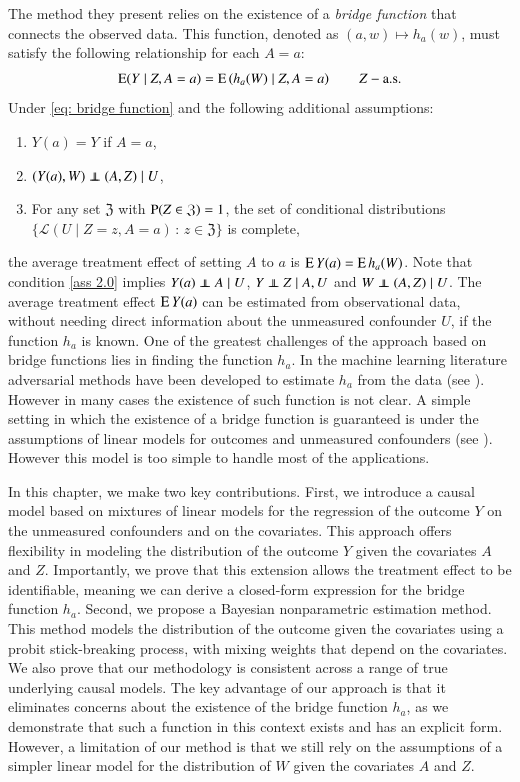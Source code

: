 The method they present relies on the existence of a \textit{bridge function} that connects the observed data. This function, denoted as $(a, w) \mapsto h_{a}(w)$, must satisfy the following relationship for each $A = a$:
\begin{align}\label{eq: bridge function}
    \mathrm{E} (Y \mid Z, A=a)=\mathrm{E} \left(h_{a}(W) \mid Z, A=a\right) \quad \quad Z-\text{a.s.}
\end{align}
Under \eqref{eq: bridge function} and the following additional assumptions:
\begin{enumerate}[label=\Alph*.]
    \item $Y(a)=Y$ if $A=a$, \label{ass 1.0} 
    \item $(Y(a),W) \independent (A,Z)\mid U$, \label{ass 2.0}
    \item For any set $\mathfrak{Z}$ with $\mathrm{P}(Z \in \mathfrak{Z}) = 1$, the set of conditional distributions $\{ \mathcal{L}(U \mid Z=z, A=a) \, : \, z \in \mathfrak{Z} \}$ is complete, \label{ass 3.0}
\end{enumerate}
the average treatment effect of setting $A$ to $a$ is $\mathrm{E} \, Y(a) = \mathrm{E} \, h_{a}(W)$. Note that condition \ref{ass 2.0} implies $Y(a) \independent A \mid U$, $Y \independent Z \mid A,U$ and $W \independent (A,Z) \mid U$. The average treatment effect $\mathrm{E}\, Y(a)$ can be estimated from observational data, without needing direct information about the unmeasured confounder $U$, if the function $h_a$ is known. One of the greatest challenges of the approach based on bridge functions lies in finding the function $h_a$. In the machine learning literature adversarial methods have been developed to estimate $h_a$ from the data (see \cite{118,119}). However in many cases the existence of such function is not clear. A simple setting in which the existence of a bridge function is guaranteed is under the assumptions of linear models for outcomes and unmeasured confounders (see \cite{112,113,114,115}). However this model is too simple to handle most of the applications.

In this chapter, we make two key contributions. First,  we introduce a causal model based on mixtures of linear models for the regression of the outcome $Y$ on the unmeasured confounders and on the covariates. This approach offers flexibility in modeling the distribution of the outcome $Y$ given the covariates $A$ and $Z$. Importantly, we prove that this extension allows the treatment effect to be identifiable, meaning we can derive a closed-form expression for the bridge function $h_a$. Second, we propose a Bayesian nonparametric estimation method. This method models the distribution of the outcome given the covariates using a probit stick-breaking process, with mixing weights that depend on the covariates. We also prove that our methodology is consistent across a range of true underlying causal models. The key advantage of our approach is that it eliminates concerns about the existence of the bridge function $h_a$, as we demonstrate that such a function in this context exists and has an explicit form. However, a limitation of our method is that we still rely on the assumptions of a simpler linear model for the distribution of $W$ given the covariates $A$ and $Z$.

